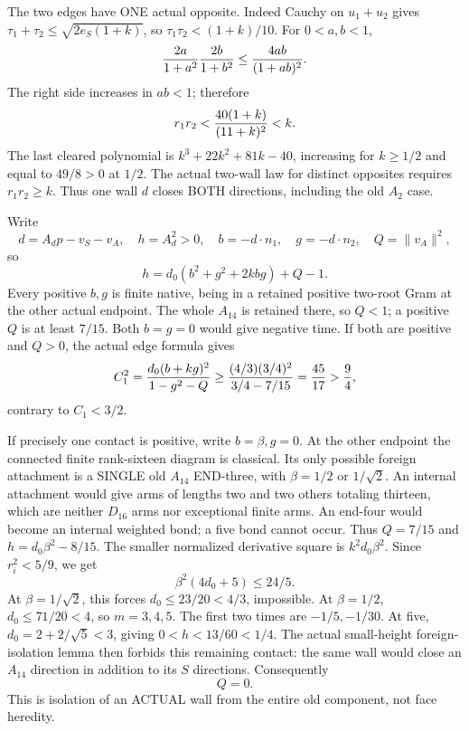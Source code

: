 \documentclass[11pt]{article}
\begin{document}
The two edges have ONE actual opposite.
Indeed Cauchy on \(u_1+u_2\) gives
\(\tau_1+\tau_2\le\sqrt{2e_S(1+k)}\),
so \(\tau_1\tau_2<(1+k)/10\).
For \(0<a,b<1\),
\[
 {2a\over1+a^2}{2b\over1+b^2}
          \le {4ab\over(1+ab)^2}.
\]
The right side increases in \(ab<1\);
therefore
\[
                         r_1r_2<{40(1+k)\over(11+k)^2}<k .
\]
The last cleared polynomial is
\(k^3+22k^2+81k-40\), increasing for
\(k\ge1/2\) and equal to \(49/8>0\)
at \(1/2\).
The actual two-wall law for distinct
opposites requires \(r_1r_2\ge k\).
Thus one wall \(d\) closes BOTH directions,
including the old \(A_2\) case.

Write
\[
 d=A_dp-v_S-v_A,\quad h=A_d^2>0,\quad
 b=-d\cdot n_1,\quad g=-d\cdot n_2,\quad Q=\|v_A\|^2,
\]
so
\[
             h=d_0(b^2+g^2+2kbg)+Q-1 .
\]
Every positive \(b,g\) is finite native,
being in a retained positive two-root Gram
at the other actual endpoint.
The whole \(A_{14}\) is retained there,
so \(Q<1\); a positive \(Q\) is at least
\(7/15\).
Both \(b=g=0\) would give negative time.
If both are positive and \(Q>0\), the
actual edge formula gives
\[
 C_1^2={d_0(b+kg)^2\over1-g^2-Q}
       \ge{(4/3)(3/4)^2\over3/4-7/15}
       ={45\over17}>{9\over4},
\]
contrary to \(C_1<3/2\).

If precisely one contact is positive,
write \(b=\beta,g=0\).
At the other endpoint the connected finite
rank-sixteen diagram is classical.
Its only possible foreign attachment is
a SINGLE old \(A_{14}\) END-three, with
\(\beta=1/2\) or \(1/\sqrt2\).
An internal attachment would give arms
of lengths two and two others totaling
thirteen, which are neither \(D_{16}\)
arms nor exceptional finite arms.
An end-four would become an internal
weighted bond; a five bond cannot occur.
Thus \(Q=7/15\) and
\(h=d_0\beta^2-8/15\).
The smaller normalized derivative square is
\(k^2d_0\beta^2\).
Since \(r_i^2<5/9\), we get
\[
                          \beta^2(4d_0+5)\le24/5 .
\]
At \(\beta=1/\sqrt2\), this forces
\(d_0\le23/20<4/3\), impossible.
At \(\beta=1/2\), \(d_0\le71/20<4\),
so \(m=3,4,5\).
The first two times are \(-1/5,-1/30\).
At five, \(d_0=2+2/\sqrt5<3\), giving
\(0<h<13/60<1/4\).
The actual small-height foreign-isolation
lemma then forbids this remaining contact:
the same wall would close an \(A_{14}\)
direction in addition to its \(S\) directions.
Consequently
\[
                         Q=0 .
\tag{A14coreiso}\label{eq:arithA14spectatorisolated}
\]
This is isolation of an ACTUAL wall from
the entire old component, not face heredity.
\end{document}
